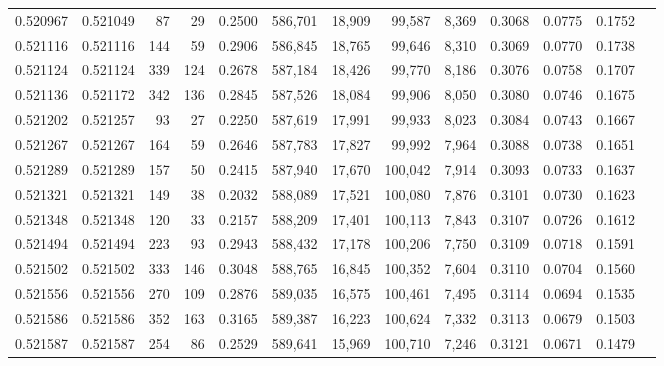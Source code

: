 \begin{tabular}{rrrrrrrrrrrrr}
0.520967 & 0.521049 &    87 &    29 &                                     0.2500 & 586,701 &  18,909 &  99,587 &   8,369 & 0.3068 & 0.0775 & 0.1752 \\
0.521116 & 0.521116 &   144 &    59 &                                     0.2906 & 586,845 &  18,765 &  99,646 &   8,310 & 0.3069 & 0.0770 & 0.1738 \\
0.521124 & 0.521124 &   339 &   124 &                                     0.2678 & 587,184 &  18,426 &  99,770 &   8,186 & 0.3076 & 0.0758 & 0.1707 \\
0.521136 & 0.521172 &   342 &   136 &                                     0.2845 & 587,526 &  18,084 &  99,906 &   8,050 & 0.3080 & 0.0746 & 0.1675 \\
0.521202 & 0.521257 &    93 &    27 &                                     0.2250 & 587,619 &  17,991 &  99,933 &   8,023 & 0.3084 & 0.0743 & 0.1667 \\
0.521267 & 0.521267 &   164 &    59 &                                     0.2646 & 587,783 &  17,827 &  99,992 &   7,964 & 0.3088 & 0.0738 & 0.1651 \\
0.521289 & 0.521289 &   157 &    50 &                                     0.2415 & 587,940 &  17,670 & 100,042 &   7,914 & 0.3093 & 0.0733 & 0.1637 \\
0.521321 & 0.521321 &   149 &    38 &                                     0.2032 & 588,089 &  17,521 & 100,080 &   7,876 & 0.3101 & 0.0730 & 0.1623 \\
0.521348 & 0.521348 &   120 &    33 &                                     0.2157 & 588,209 &  17,401 & 100,113 &   7,843 & 0.3107 & 0.0726 & 0.1612 \\
0.521494 & 0.521494 &   223 &    93 &                                     0.2943 & 588,432 &  17,178 & 100,206 &   7,750 & 0.3109 & 0.0718 & 0.1591 \\
0.521502 & 0.521502 &   333 &   146 &                                     0.3048 & 588,765 &  16,845 & 100,352 &   7,604 & 0.3110 & 0.0704 & 0.1560 \\
0.521556 & 0.521556 &   270 &   109 &                                     0.2876 & 589,035 &  16,575 & 100,461 &   7,495 & 0.3114 & 0.0694 & 0.1535 \\
0.521586 & 0.521586 &   352 &   163 &                                     0.3165 & 589,387 &  16,223 & 100,624 &   7,332 & 0.3113 & 0.0679 & 0.1503 \\
0.521587 & 0.521587 &   254 &    86 &                                     0.2529 & 589,641 &  15,969 & 100,710 &   7,246 & 0.3121 & 0.0671 & 0.1479 \\

\end{tabular}
